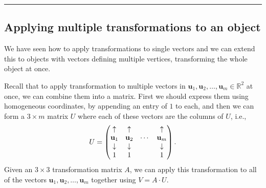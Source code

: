 \documentclass[letterpaper,10pt,english]{jupyterBook}
\begin{document}
\bigskip\hrule\bigskip



\subsection{Applying multiple transformations to an object}
\label{\detokenize{_pages/6.4_Translation:applying-multiple-transformations-to-an-object}}
\sphinxAtStartPar
We have seen how to apply transformations to single vectors \sphinxhyphen{} and we can extend this to objects with vectors defining multiple vertices, transforming the whole object at once.

\sphinxAtStartPar
Recall that to apply transformation to multiple vectors in \(\mathbf{u}_1, \mathbf{u}_2, \ldots, \mathbf{u}_m \in \mathbb{R}^2\) at once, we can combine them into a matrix. First we should express them using homogeneous co\sphinxhyphen{}ordinates, by appending an entry of \(1\) to each, and then we can form a \(3 \times m\) matrix \(U\) where each of these vectors are the columns of \(U\), i.e.,
\begin{equation*}
\begin{split} U =
\begin{pmatrix}
    \small{\uparrow} & \small{\uparrow} & & \small{\uparrow} \\
    \mathbf{u}_1 & \mathbf{u}_2 & \cdots & \mathbf{u}_m \\
    \small{\downarrow} & \small{\downarrow} & & \small{\downarrow} \\
    1 & 1 & & 1 
\end{pmatrix}. \end{split}
\end{equation*}
\sphinxAtStartPar
Given an \(3 \times 3\) transformation matrix \(A\), we can apply this transformation to all of the vectors \(\mathbf{u}_1, \mathbf{u}_2, \ldots, \mathbf{u}_m\) together using \(V = A \cdot U.\)
\label{_pages/6.4_Translation:rotation-scaling-and-translating-example}
\end{document}
